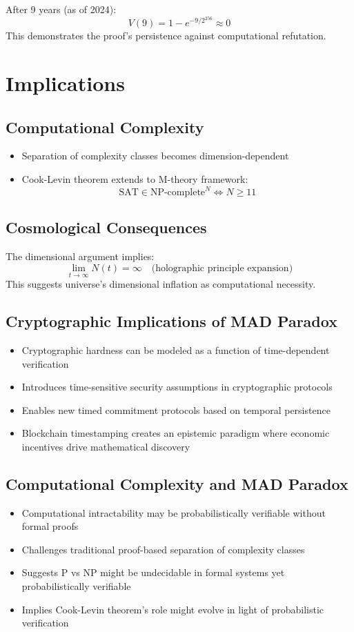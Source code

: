 \documentclass{article}
\begin{document}
After 9 years (as of 2024):
\[
V(9) = 1 - e^{-9/2^{256}} \approx 0
\]
This demonstrates the proof's persistence against computational refutation.

\section{Implications}
\subsection{Computational Complexity}
\begin{itemize}
    \item Separation of complexity classes becomes dimension-dependent
    \item Cook-Levin theorem extends to M-theory framework:
\[
\text{SAT} \in \text{NP-complete}^{N} \iff N \geq 11
\]
\end{itemize}

\subsection{Cosmological Consequences}
The dimensional argument implies:
\[
\lim_{t \to \infty} N(t) = \infty \quad \text{(holographic principle expansion)}
\]
This suggests universe's dimensional inflation as computational necessity.

\subsection{Cryptographic Implications of MAD Paradox}
\begin{itemize}
    \item Cryptographic hardness can be modeled as a function of time-dependent verification
    \item Introduces time-sensitive security assumptions in cryptographic protocols
    \item Enables new timed commitment protocols based on temporal persistence
    \item Blockchain timestamping creates an epistemic paradigm where economic incentives drive mathematical discovery
\end{itemize}

\subsection{Computational Complexity and MAD Paradox}
\begin{itemize}
    \item Computational intractability may be probabilistically verifiable without formal proofs
    \item Challenges traditional proof-based separation of complexity classes
    \item Suggests P vs NP might be undecidable in formal systems yet probabilistically verifiable
    \item Implies Cook-Levin theorem's role might evolve in light of probabilistic verification
\end{itemize}
\end{document}
